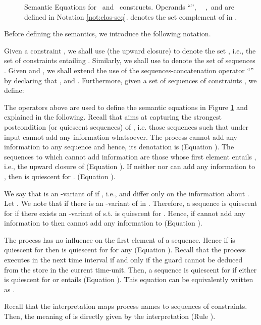 \documentclass{tlp}
\begin{document}
\begin{figure}
{

}
\caption{Semantic Equations for \tccp\ and \utcc\ constructs. Operands ``'',  \ \ ,\    and  are defined in Notation \ref{not:clos-seq}.  denotes the set complement of  in . \label{tab:densem} }
\end{figure}
Before  defining the semantics, we introduce the following notation.
 \begin{notation}\label{not:clos-seq}
    Given a constraint , we shall use  (the upward closure)  to denote the set , i.e., the set of constraints entailing . Similarly, we shall use  to denote the set of sequences .
Given  and , we shall extend the use of  the sequences-concatenation operator ``'' by declaring that ,  and . 
Furthermore, given a set of sequences of constraints , we define:
 
 \end{notation}
The operators above are used to define the semantic equations  in Figure \ref{tab:densem} and explained in the following. 
 Recall that  aims at capturing the strongest postcondition (or quiescent sequences) of , i.e. those  sequences  such that  under input  cannot add any information whatsoever. The process  cannot add any information to any sequence and hence, its denotation is  (Equation ).    The sequences to which  cannot add information are those whose first element entails , i.e., the upward closure of  (Equation ). If neither  nor  can add any information to , then  is quiescent for . (Equation ). 
  
  We say that   is an -variant of  if
, i.e.,  and  differ only on the information about  . Let . We note that 
 if there is an -variant  of  in . 
Therefore, a sequence  is  quiescent for  if there exists an -variant  of  s.t.  is quiescent for .  Hence, if  cannot add any information to  then   cannot add any information to  (Equation ). 


The process  has no influence on the first 
element of a sequence. Hence if  is quiescent for  then  is quiescent for  for any    (Equation ). 
Recall that the process  executes  in the next time interval if and only if the guard  cannot be deduced from the store in the current time-unit. Then, a sequence  is quiescent for   if either   is quiescent for  or  entails   (Equation ). This equation can be equivalently written as  .

Recall that the interpretation  maps process names to sequences of constraints. Then, the meaning of   is directly given by the interpretation  (Rule ). 
\end{document}
